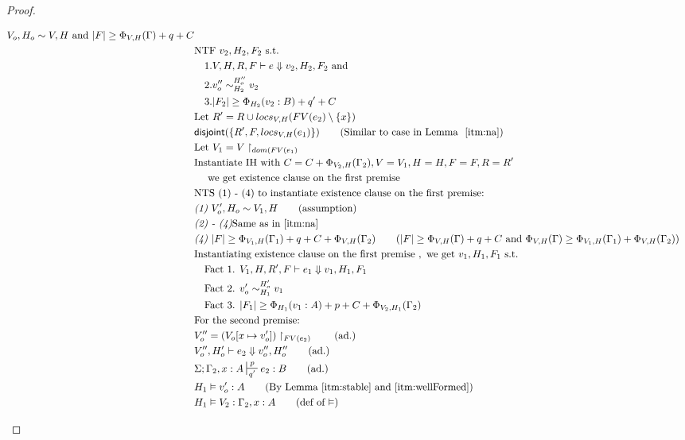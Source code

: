 \documentclass{easychair}
\newcommand{\dist}[1]{\mathsf{disjoint}(#1)}
\newcommand{\veq}[4]{#3 \sim^{#1}_{#2} #4}
\theoremstyle{definition}
\begin{document}
\begin{proof}
\begin{description}
\begin{align*}
		V_o,H_o \sim V,H
			\text{ and }|F| \ge \Phi_{V,H}(\Gamma) + q + C\\
  &\text{NTF } v_2,H_2,F_2 \text{ s.t. }\\
  &\quad 1. V,H,R,F \vdash e \Downarrow v_2, H_2,F_2 \text{ and }\\ 
	&\quad 2. \veq{H_o''}{H_2}{v_o''}{v_2}\\
  &\quad 3. |F_2| \ge \Phi_{H_2}(v_2:B) + q' + C\\
	&\text{Let } R' = R \cup locs_{V,H}(FV(e_2) \setminus \{x\})\\
  &\dist{\{R',F,locs_{V,H}(e_1)\}} \tag{Similar to case in Lemma $~\ref{itm:na}$}\\
	&\text{Let } V_1 = V\restriction_{dom(FV(e_1)}\\
  &\text{Instantiate IH with } C = C + \Phi_{V_2,H}(\Gamma_2), V = V_1, H = H, F = F, R = R'\\ 
	&\quad\text{ we get existence clause on the first premise }\\
  &\text{NTS (1) - (4) to instantiate existence clause on the first premise: } \\
	&\emph{(1) } V_o',H_o \sim V_1, H \tag{assumption}\\
		&\emph{(2) - (4)} \text{Same as in \ref{itm:na}}\\
  &\emph{(4) } |F| \ge \Phi_{V_1,H}(\Gamma_1) + q + C + \Phi_{V,H}(\Gamma_2) \tag{$|F| \ge \Phi_{V,H}(\Gamma) + q + C$ and $\Phi_{V,H}(\Gamma) \ge \Phi_{V_1,H}(\Gamma_1) + \Phi_{V,H}(\Gamma_2)$}\\
  &\text{Instantiating existence clause on the first premise } , \text{ we get } 
		v_1,H_1,F_1 \text{ s.t. }\\
		&\quad \text{Fact 1. } V_1,H,R',F \vdash e_1 \Downarrow v_1, H_1,F_1\\
		&\quad \text{Fact 2. } \veq{H_o'}{H_1}{v_o'}{v_1}\\
		&\quad \text{Fact 3. } |F_1| \ge \Phi_{H_1}(v_1:A) + p + C + \Phi_{V_2,H_1}(\Gamma_2)\\
  &\text{For the second premise: }\\
	&V_o'' = (V_o[x \mapsto v_o'])\restriction_{FV(e_2)} \tag{ad.}\\
  &V_o'',H_o' \vdash e_2 \Downarrow v_o'',H_o'' \tag{ad.}\\
  &\Sigma; \Gamma_2, x : A \sststile{q'}{p} e_2 : B \tag{ad.}\\
	&H_1 \vDash v_o' : A \tag{By Lemma~\ref{itm:stable} and~\ref{itm:wellFormed}}\\ 
	&H_1 \vDash V_2 : \Gamma_2, x : A \tag{def of $\vDash$}\\

\end{align*}
\end{description}
\end{proof}
\end{document}
